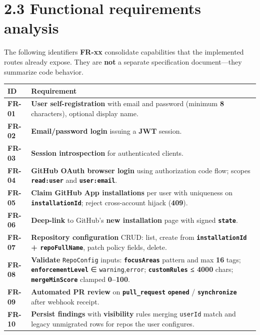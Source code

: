\documentclass[11pt,a4paper]{report}
\begin{document}
\section{2.3 Functional requirements analysis}


The following identifiers \textbf{FR-xx} consolidate capabilities that the implemented routes already expose. They are \textbf{not} a separate specification document—they summarize code behavior.


\begingroup\small
\begin{tabular}{@{}p{}p{}@{}}
\toprule
ID & Requirement \\
\midrule
\textbf{FR-01} & \textbf{User self-registration} with email and password (minimum \textbf{8} characters), optional display name. \\
\textbf{FR-02} & \textbf{Email/password login} issuing a \textbf{JWT} session. \\
\textbf{FR-03} & \textbf{Session introspection} for authenticated clients. \\
\textbf{FR-04} & \textbf{GitHub OAuth browser login} using authorization code flow; scopes \textbf{\texttt{read:user}} and \textbf{\texttt{user:email}}. \\
\textbf{FR-05} & \textbf{Claim GitHub App installations} per user with uniqueness on \textbf{\texttt{installationId}}; reject cross-account hijack (\textbf{409}). \\
\textbf{FR-06} & \textbf{Deep-link} to GitHub’s \textbf{new installation} page with signed \textbf{\texttt{state}}. \\
\textbf{FR-07} & \textbf{Repository configuration} CRUD: list, create from \textbf{\texttt{installationId} + \texttt{repoFullName}}, patch policy fields, delete. \\
\textbf{FR-08} & \textbf{Validate} \texttt{RepoConfig} inputs: \textbf{\texttt{focusAreas}} pattern and max \textbf{16} tags; \textbf{\texttt{enforcementLevel}} ∈ {\texttt{warning},\texttt{error}}; \textbf{\texttt{customRules} ≤ 4000} chars; \textbf{\texttt{mergeMinScore}} clamped \textbf{0–100}. \\
\textbf{FR-09} & \textbf{Automated PR review} on \textbf{\texttt{pull\_request}} \textbf{\texttt{opened}} / \textbf{\texttt{synchronize}} after webhook receipt. \\
\textbf{FR-10} & \textbf{Persist findings} with \textbf{visibility} rules merging \texttt{userId} match and legacy unmigrated rows for repos the user configures. \\

\end{tabular}
\end{document}
